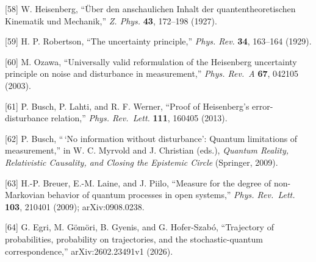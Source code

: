 \documentclass[
]{article}
\begin{document}
{[}58{]} W. Heisenberg, ``Über den anschaulichen Inhalt der
quantentheoretischen Kinematik und Mechanik,'' \emph{Z. Phys.}
\textbf{43}, 172--198 (1927).

{[}59{]} H. P. Robertson, ``The uncertainty principle,'' \emph{Phys.
Rev.} \textbf{34}, 163--164 (1929).

{[}60{]} M. Ozawa, ``Universally valid reformulation of the Heisenberg
uncertainty principle on noise and disturbance in measurement,''
\emph{Phys. Rev.~A} \textbf{67}, 042105 (2003).

{[}61{]} P. Busch, P. Lahti, and R. F. Werner, ``Proof of Heisenberg's
error-disturbance relation,'' \emph{Phys. Rev.~Lett.} \textbf{111},
160405 (2013).

{[}62{]} P. Busch, ``\,`No information without disturbance': Quantum
limitations of measurement,'' in W. C. Myrvold and J. Christian (eds.),
\emph{Quantum Reality, Relativistic Causality, and Closing the Epistemic
Circle} (Springer, 2009).

{[}63{]} H.-P. Breuer, E.-M. Laine, and J. Piilo, ``Measure for the
degree of non-Markovian behavior of quantum processes in open systems,''
\emph{Phys. Rev.~Lett.} \textbf{103}, 210401 (2009); arXiv:0908.0238.

{[}64{]} G. Egri, M. Gömöri, B. Gyenis, and G. Hofer-Szabó, ``Trajectory
of probabilities, probability on trajectories, and the
stochastic-quantum correspondence,'' arXiv:2602.23491v1 (2026).
\end{document}
